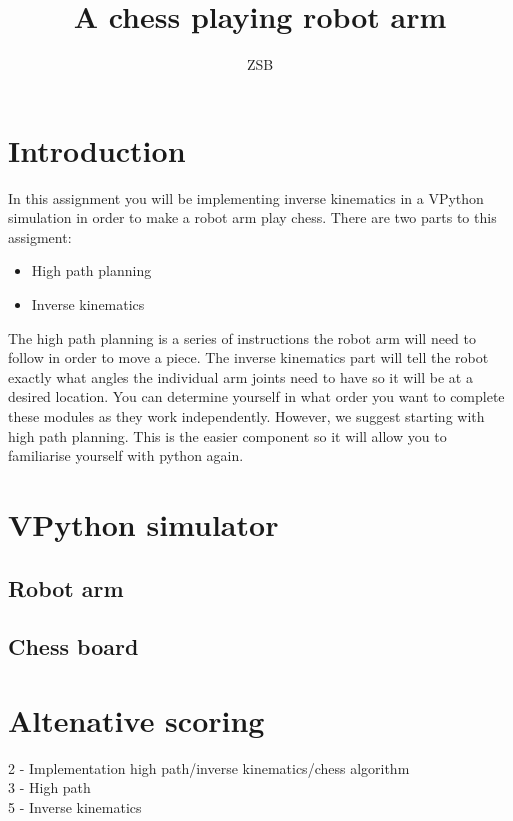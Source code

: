 \documentclass{article}
\title{A chess playing robot arm}
\author{ZSB}
\date{}
\begin{document}
\maketitle

\section*{Introduction}

In this assignment you will be implementing inverse kinematics in a VPython simulation in order to make a robot arm play chess. There are two parts to this assigment:
\begin{itemize}
    \item High path planning
    \item Inverse kinematics
\end{itemize}
The high path planning is a series of instructions the robot arm will need to follow in order to move a piece. The inverse kinematics part will tell the robot exactly what angles the individual arm joints need to have so it will be at a desired location. You can determine yourself in what order you want to complete these modules as they work independently. However, we suggest starting with high path planning. This is the easier component so it will allow you to familiarise yourself with python again.

\section*{VPython simulator}
\subsection*{Robot arm}
\subsection*{Chess board}

\section*{Altenative scoring}
2 - Implementation high path/inverse kinematics/chess algorithm\\
3 - High path\\
5 - Inverse kinematics
\end{document}
